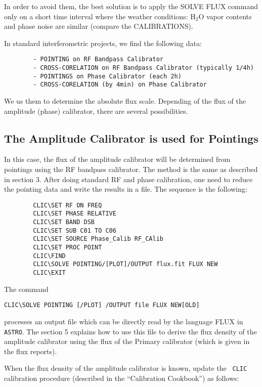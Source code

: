 \documentclass[11pt]{article}
\begin{document}
In order to avoid them, the best solution is to apply the SOLVE FLUX
command only on a short time interval where the weather conditions: H$_2$O
vapor contents and phase noise are similar (compare the CALIBRATIONS).

In standard interferometric projects, we find the following data:
 
\begin{verbatim}
        - POINTING on RF Bandpass Calibrator
        - CROSS-CORELATION on RF Bandpass Calibrator (typically 1/4h)
        - POINTINGS on Phase Calibrator (each 2h)
        - CROSS-CORELATION (by 4min) on Phase Calibrator 
\end{verbatim}

We us them to determine the absolute flux scale.  Depending of the flux of
the amplitude (phase) calibrator, there are several possibilities.

\subsection{The Amplitude Calibrator is used for Pointings} 
 
In this case, the flux of the amplitude calibrator will be determined from
pointings using the RF bandpass calibrator.  The method is the same as
described in section 3. After doing standard RF and phase calibration, one
need to reduce the pointing data and write the results in a file. The
sequence is the following:

\begin{verbatim}
        CLIC\SET RF ON FREQ
        CLIC\SET PHASE RELATIVE
        CLIC\SET BAND DSB
        CLIC\SET SUB C01 TO C06
        CLIC\SET SOURCE Phase_Calib RF_CAlib
        CLIC\SET PROC POINT
        CLIC\FIND
        CLIC\SOLVE POINTING/[PLOT]/OUTPUT flux.fit FLUX NEW
        CLIC\EXIT
\end{verbatim}

The command
\begin{verbatim}
CLIC\SOLVE POINTING [/PLOT] /OUTPUT file FLUX NEW[OLD]
\end{verbatim}
processes an output file which can be directly read by the language FLUX in
{\tt ASTRO}. The section 5 explains how to use this file to derive the flux
density of the amplitude calibrator using the flux of the Primary
calibrator (which is given in the flux reports).

When the flux density of the amplitude calibrator is known, update the {\tt
  CLIC} calibration procedure (described in the ``Calibration Cookbook'')
as follows:
\end{document}
